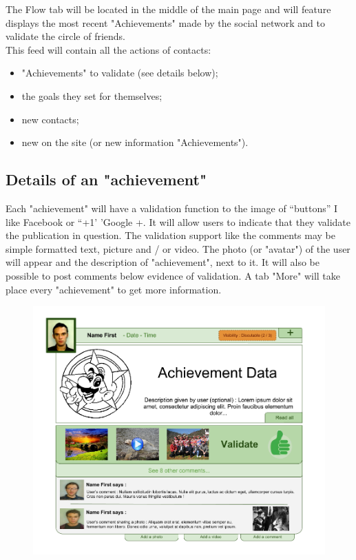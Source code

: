 \documentclass {life-en}
\begin{document}
The Flow tab will be located in the middle of the main page and will feature displays the most recent "Achievements" made by the social network and to validate the circle of friends.\\

This feed will contain all the actions of contacts:

\begin{itemize}
  \item "Achievements" to validate (see details below);
  \item the goals they set for themselves;
  \item new contacts;
  \item new on the site (or new information "Achievements").
\end{itemize}

\newpage

\subsection{Details of an "achievement"}

Each "achievement" will have a validation function to the image of ``buttons'' I like Facebook or ``+1' 'Google +. It will allow users to indicate that they validate the publication in question. The validation support like the comments may be simple formatted text, picture and / or video. The photo (or "avatar") of the user will appear and the description of "achievement", next to it. It will also be possible to post comments below evidence of validation. A tab "More" will take place every "achievement" to get more information.\\

\begin{figure} [H]
  \begin{center}
    \includegraphics [width = 15cm]{img/achievement.png}
  \end{center}
\end{figure}
\end{document}
